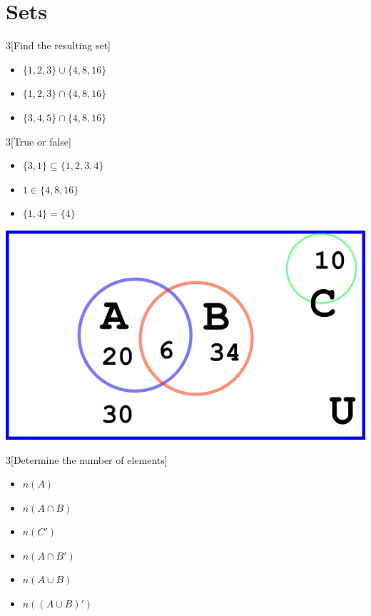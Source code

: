 \documentclass[14pt]{extarticle}
\begin{document}
\cleardoublepage

\section{Sets}
	\begin{multicols}{3}[Find the resulting set]
		\begin{itemize}
			\item $\{1,2,3\} \cup \{4,8,16\}$
			\item  $\{1,2,3\} \cap \{4,8,16\}$ 
			\item  $\{3, 4, 5\} \cap \{4,8,16\}$ 
		\end{itemize}
	\end{multicols}
\vspace{2cm}
	\begin{multicols}{3}[True or false]
		\begin{itemize}
			\item $\{3,1\} \subseteq \{1,2,3,4\}$
			\item $1 \in \{4,8,16\}$ 
			\item $\{1,4\} = \{4\}$ 
		\end{itemize}
	\end{multicols}
\vspace{2cm}
\includegraphics[width=0.8\linewidth]{venn-3}\\
	\begin{multicols}{3}[Determine the number of elements]
		\begin{itemize}
			\item $n(A)$
			\item $n(A\cap B)$ 
			\item $n(C')$
			\item $n(A\cap B')$
			\item $n(A\cup B)$ 
			\item $n((A\cup B)')$ 
		\end{itemize}
	\end{multicols}
\end{document}
